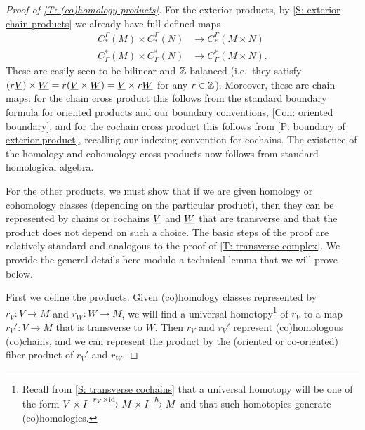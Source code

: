 \begin{proof}[Proof of \cref{T: (co)homology products}]
	For the exterior products, by \cref{S: exterior chain products} we already have full-defined maps
	\begin{align*}C^\Gamma_*(M) \times C^\Gamma_*(N)& \to C^\Gamma_*(M \times N)\\ C_\Gamma^*(M) \times C_\Gamma^*(N)& \to C_\Gamma^*(M \times N).
	\end{align*}
	These are easily seen to be bilinear and $\mathbb{Z}$-balanced (i.e.\ they satisfy $(r\underline{V}) \times \underline{W} = r(\underline{V} \times \underline{W}) = \underline{V} \times r\underline{W}$ for any $r \in \mathbb{Z}$).
	Moreover, these are chain maps: for the chain cross product this follows from the standard boundary formula for oriented products and our boundary conventions, \cref{Con: oriented boundary}, and for the cochain cross product this follows from \cref{P: boundary of exterior product}, recalling our indexing convention for cochains.
	The existence of the homology and cohomology cross products now follows from standard homological algebra.

	For the other products, we must show that if we are given homology or cohomology classes (depending on the particular product), then they can be represented by chains or cochains $\underline{V}$ and $\underline{W}$ that are transverse and that the product does not depend on such a choice.
	The basic steps of the proof are relatively standard and analogous to the proof of \cref{T: transverse complex}.
	We provide the general details here modulo a technical lemma that we will prove below.

	First we define the products.
	Given (co)homology classes represented by $r_V \colon V \to M$ and $r_W \colon W \to M$, we will find a universal homotopy\footnote{Recall from \cref{S: transverse cochains} that a universal homotopy will be one of the form $V \times I \xrightarrow{r_V \times \mathrm{id}} M \times I \xrightarrow{h} M$ and that such homotopies generate (co)homologies.} of $r_V$ to a map $r_V' \colon V \to M$ that is transverse to $W$.
	Then $r_V$ and $r_V'$ represent (co)homologous (co)chains, and we can represent the product by the (oriented or co-oriented) fiber product of $r_V'$ and $r_W$.


\end{proof}
